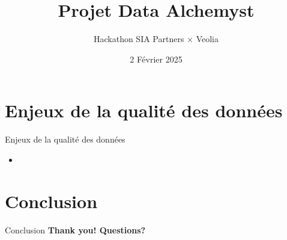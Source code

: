 \documentclass{beamer}
\title{Projet Data Alchemyst}
\subtitle{Hackathon SIA Partners $\times$ Veolia}
\date{2 Février 2025}
\begin{document}
\begin{frame}
	\titlepage
\end{frame}

\section{Enjeux de la qualité des données}
\begin{frame}{Enjeux de la qualité des données}
	\vspace*{-1cm}
	\begin{itemize}
		\item 
	\end{itemize}
\end{frame}


\section{Conclusion}
\begin{frame}{Conclusion}
	\centering
	\textbf{Thank you! Questions?}
\end{frame}
\end{document}
